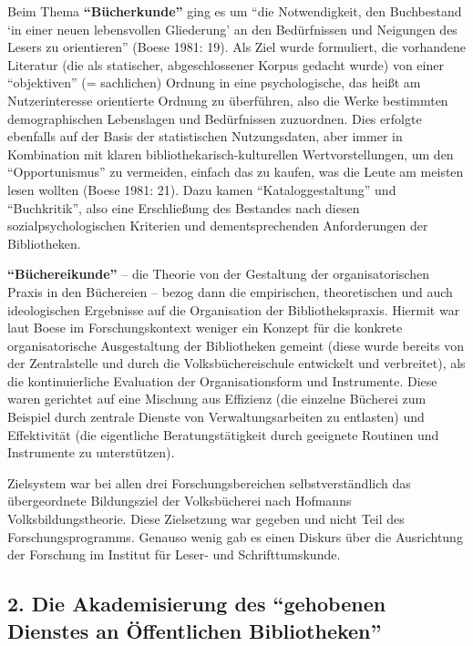 \documentclass[a4paper,
fontsize=11pt,
oneside,
numbers=noperiodatend,
parskip=half-,
bibliography=totoc,
final
]{scrartcl}
\begin{document}
Beim Thema \textbf{\enquote{Bücherkunde}} ging es um \enquote{die
Notwendigkeit, den Buchbestand \enquote{in einer neuen lebensvollen
Gliederung} an den Bedürfnissen und Neigungen des Lesers zu orientieren}
(Boese 1981: 19). Als Ziel wurde formuliert, die vorhandene Literatur
(die als statischer, abgeschlossener Korpus gedacht wurde) von einer
\enquote{objektiven} (= sachlichen) Ordnung in eine psychologische, das
heißt am Nutzerinteresse orientierte Ordnung zu überführen, also die
Werke bestimmten demographischen Lebenslagen und Bedürfnissen
zuzuordnen. Dies erfolgte ebenfalls auf der Basis der statistischen
Nutzungsdaten, aber immer in Kombination mit klaren
bibliothekarisch-kulturellen Wertvorstellungen, um den
\enquote{Opportunismus} zu vermeiden, einfach das zu kaufen, was die
Leute am meisten lesen wollten (Boese 1981: 21). Dazu kamen
\enquote{Kataloggestaltung} und \enquote{Buchkritik}, also eine
Erschließung des Bestandes nach diesen sozialpsychologischen Kriterien
und dementsprechenden Anforderungen der Bibliotheken.

\textbf{\enquote{Büchereikunde}} -- die Theorie von der Gestaltung der
organisatorischen Praxis in den Büchereien -- bezog dann die
empirischen, theoretischen und auch ideologischen Ergebnisse auf die
Organisation der Bibliothekspraxis. Hiermit war laut Boese im
Forschungskontext weniger ein Konzept für die konkrete organisatorische
Ausgestaltung der Bibliotheken gemeint (diese wurde bereits von der
Zentralstelle und durch die Volksbüchereischule entwickelt und
verbreitet), als die kontinuierliche Evaluation der Organisationsform
und Instrumente. Diese waren gerichtet auf eine Mischung aus Effizienz
(die einzelne Bücherei zum Beispiel durch zentrale Dienste von
Verwaltungsarbeiten zu entlasten) und Effektivität (die eigentliche
Beratungstätigkeit durch geeignete Routinen und Instrumente zu
unterstützen).

Zielsystem war bei allen drei Forschungsbereichen selbstverständlich das
übergeordnete Bildungsziel der Volksbücherei nach Hofmanns
Volksbildungstheorie. Diese Zielsetzung war gegeben und nicht Teil des
Forschungsprogramms. Genauso wenig gab es einen Diskurs über die
Ausrichtung der Forschung im Institut für Leser- und Schrifttumskunde.

\hypertarget{die-akademisierung-des-gehobenen-dienstes-an-uxf6ffentlichen-bibliotheken}{%
\subsection{\texorpdfstring{2. Die Akademisierung des \enquote{gehobenen
Dienstes an Öffentlichen
Bibliotheken}}{2. Die Akademisierung des ``gehobenen Dienstes an Öffentlichen Bibliotheken''}}\label{die-akademisierung-des-gehobenen-dienstes-an-uxf6ffentlichen-bibliotheken}}
\end{document}
